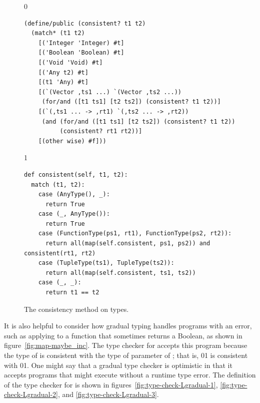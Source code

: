 \documentclass[7x10]{TimesAPriori_MIT}%
\newcommand{\gray}[1]{{\color{gray} #1}}
\def\racketEd{0}
\def\pythonEd{1}
\def\edition{1}
\newcommand{\racket}[1]{{\if\edition\racketEd{#1}\fi}}
\newcommand{\pythonColor}[0]{}
\newcommand{\python}[1]{{\if\edition\pythonEd\pythonColor #1\fi}}
\numberwithin{theorem}{chapter}
\numberwithin{definition}{chapter}
\numberwithin{equation}{chapter}
\begin{document}
\begin{figure}[tbp]
  \begin{tcolorbox}[colback=white]
{\if\edition\racketEd    
\begin{lstlisting}
(define/public (consistent? t1 t2)
  (match* (t1 t2)
    [('Integer 'Integer) #t]
    [('Boolean 'Boolean) #t]
    [('Void 'Void) #t]
    [('Any t2) #t]
    [(t1 'Any) #t]
    [(`(Vector ,ts1 ...) `(Vector ,ts2 ...))
     (for/and ([t1 ts1] [t2 ts2]) (consistent? t1 t2))]
    [(`(,ts1 ... -> ,rt1) `(,ts2 ... -> ,rt2))
     (and (for/and ([t1 ts1] [t2 ts2]) (consistent? t1 t2))
          (consistent? rt1 rt2))]
    [(other wise) #f]))
\end{lstlisting}
\fi}
{\if\edition\pythonEd\pythonColor
\begin{lstlisting}
def consistent(self, t1, t2):
  match (t1, t2):
    case (AnyType(), _):
      return True
    case (_, AnyType()):
      return True
    case (FunctionType(ps1, rt1), FunctionType(ps2, rt2)):
      return all(map(self.consistent, ps1, ps2)) and consistent(rt1, rt2)
    case (TupleType(ts1), TupleType(ts2)):
      return all(map(self.consistent, ts1, ts2))
    case (_, _):
      return t1 == t2
\end{lstlisting}  
  \fi}
\vspace{-5pt}
  \end{tcolorbox}

  \caption{The consistency method on types.}
\label{fig:consistent}
\end{figure}

It is also helpful to consider how gradual typing handles programs with an
error, such as applying  to a function that sometimes
returns a Boolean, as shown in figure~\ref{fig:map-maybe_inc}.  The
type checker for \LangGrad{} accepts this program because the type of
 is consistent with the type of parameter  of
; that is, 
\racket{}\python{}
is consistent with
\racket{}\python{}.
One might say that a gradual type checker is optimistic in that it
accepts programs that might execute without a runtime type error.
%
The definition of the type checker for \LangGrad{} is shown in
figures~\ref{fig:type-check-Lgradual-1}, \ref{fig:type-check-Lgradual-2},
and \ref{fig:type-check-Lgradual-3}.

\end{document}
